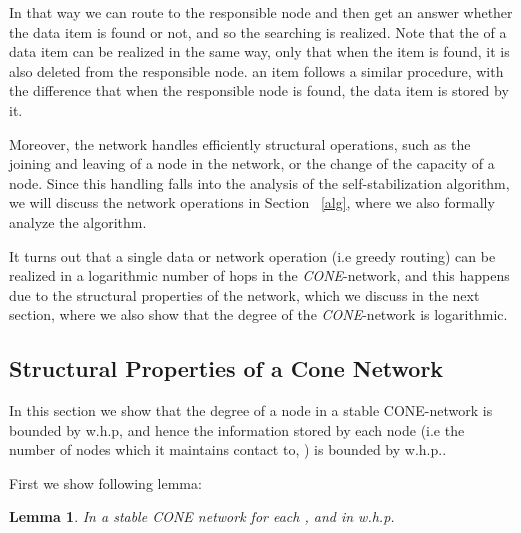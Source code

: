 \documentclass[11pt]{article}
\newtheorem{lemma}[theorem]{Lemma}
\begin{document}
 In that way we can route to the responsible node and then get an answer whether the data item is found or not, and so the searching is realized.
Note that the  of a data item can be realized in the same way, only that when the item is found, it is also deleted from the responsible node.
 an item follows a similar procedure, with the difference that when the responsible node is found, the data item is stored by it.


Moreover, the network handles efficiently structural operations, such as the joining and leaving of a node in the network, or the change of the capacity of
a node. Since this handling falls into the analysis of the self-stabilization algorithm, we will discuss the network operations in Section ~\ref{alg}, where we also formally analyze the algorithm.

It turns out that a single data or network operation (i.e greedy routing) can be realized in a logarithmic number of hops in the \emph{CONE}-network, and this happens due  to
the structural properties of the network, which we discuss in the next section, where we also show that the degree of the \emph{CONE}-network is logarithmic.

\subsection{Structural Properties of a Cone Network}

In this section we show that the degree of a node in a stable CONE-network is bounded by  w.h.p, and hence the information stored by each node (i.e the number of nodes which it maintains contact to, ) is bounded by  w.h.p..

First we show following lemma:

\begin{lemma}\label{log}
In a stable CONE network for each ,  and  in  w.h.p.
\end{lemma}
\end{document}
